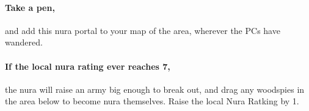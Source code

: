 \begin{multicols}{2}
\paragraph{Take a pen,}
and add this nura portal to your map of the area, wherever the PCs have wandered.

\paragraph{If the local nura rating ever reaches 7,}
the nura will raise an army big enough to break out, and drag any woodspies in the area below to become nura themselves.
Raise the local Nura Ratking by 1.


\stopcontents[sq]

\end{multicols}

\stopcontents[Forest]


